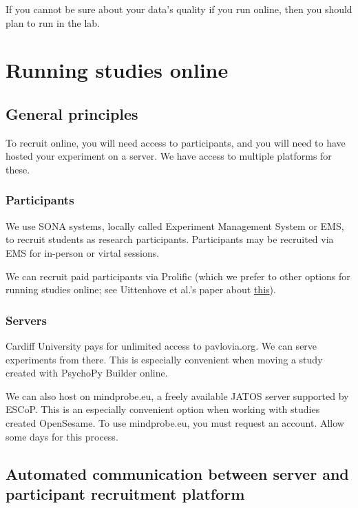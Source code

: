 \documentclass[
  12pt,
]{book}
\begin{document}
If you cannot be sure about your data's quality if you run online, then you should plan to run in the lab.

\chapter{Running studies online}\label{running-studies-online}

\section{General principles}\label{general-principles}

To recruit online, you will need access to participants, and you will need to have hosted your experiment on a server. We have access to multiple platforms for these.

\subsection{Participants}\label{participants}

We use SONA systems, locally called Experiment Management System or EMS, to recruit students as research participants. Participants may be recruited via EMS for in-person or virtal sessions.

We can recruit paid participants via Prolific (which we prefer to other options for running studies online; see Uittenhove et al.'s paper about \href{https://www.journalofcognition.org/articles/10.5334/joc.259/}{this}).

\subsection{Servers}\label{servers}

Cardiff University pays for unlimited access to pavlovia.org. We can serve experiments from there. This is especially convenient when moving a study created with PsychoPy Builder online.

We can also host on mindprobe.eu, a freely available JATOS server supported by ESCoP. This is an especially convenient option when working with studies created OpenSesame. To use mindprobe.eu, you must request an account. Allow some days for this process.

\section{Automated communication between server and participant recruitment platform}\label{automated-communication-between-server-and-participant-recruitment-platform}
\end{document}
